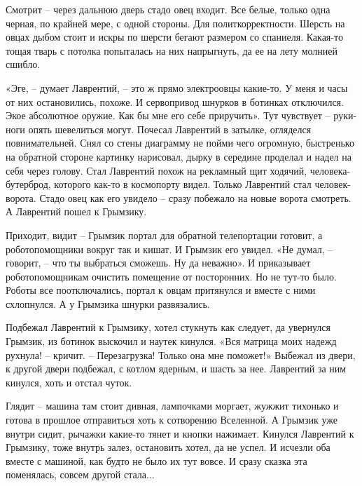 \documentclass[ebook,oneside,final,openright]{memoir}
\begin{document}
Смотрит – через дальнюю дверь стадо овец входит. Все белые, только одна черная, по крайней мере, с одной стороны. Для политкорректности. Шерсть на овцах дыбом стоит и искры по шерсти бегают размером со спаниеля. Какая-то тощая тварь с потолка попыталась на них напрыгнуть, да ее на лету молнией сшибло.\par
\par
«Эге, – думает Лаврентий, – это ж прямо электроовцы какие-то. У меня и часы от них остановились, похоже. И сервопривод шнурков в ботинках отключился. Экое абсолютное оружие. Как бы мне его себе приручить». Тут чувствует – руки-ноги опять шевелиться могут. Почесал Лаврентий в затылке, огляделся повнимательней. Снял со стены диаграмму не пойми чего огромную, быстренько на обратной стороне картинку нарисовал, дырку в середине проделал и надел на себя через голову. Стал Лаврентий похож на рекламный щит ходячий, человека-бутерброд, которого как-то в космопорту видел. Только Лаврентий стал человек-ворота. Стадо овец как его увидело – сразу побежало на новые ворота смотреть. А Лаврентий пошел к Грымзику.\par
\par
Приходит, видит – Грымзик портал для обратной телепортации готовит, а роботопомощники вокруг так и кишат. И Грымзик его увидел. «Не думал, – говорит, – что ты выбраться сможешь. Ну да неважно». И приказывает роботопомощникам очистить помещение от посторонних. Но не тут-то было. Роботы все поотключались, портал к овцам притянулся и вместе с ними схлопнулся. А у Грымзика шнурки развязались.\par
\par
Подбежал Лаврентий к Грымзику, хотел стукнуть как следует, да увернулся Грымзик, из ботинок выскочил и наутек кинулся. «Вся матрица моих надежд рухнула! – кричит. – Перезагрузка! Только она мне поможет!» Выбежал из двери, к другой двери подбежал, с котлом ядерным, и шасть за нее. Лаврентий за ним кинулся, хоть и отстал чуток.\par
\par
Глядит – машина там стоит дивная, лампочками моргает, жужжит тихонько и готова в прошлое отправиться хоть к сотворению Вселенной. А Грымзик уже внутри сидит, рычажки какие-то тянет и кнопки нажимает. Кинулся Лаврентий к Грымзику, тоже внутрь залез, остановить хотел, да не успел. И исчезли оба вместе с машиной, как будто не было их тут вовсе. И сразу сказка эта поменялась, совсем другой стала...\par
\end{document}
